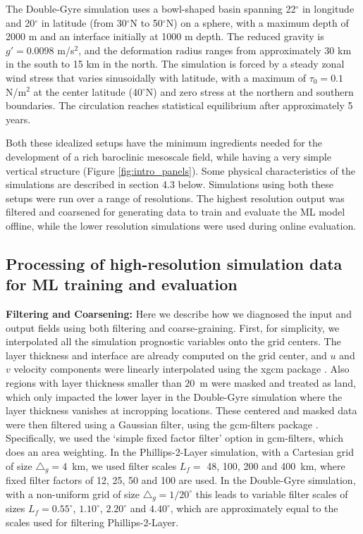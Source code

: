 \documentclass[draft]{agujournal2019}
\begin{document}
The Double-Gyre simulation uses a bowl-shaped basin spanning 22$^\circ$ in longitude and 20$^\circ$ in latitude (from 30$^\circ$N to 50$^\circ$N) on a sphere, with a maximum depth of 2000 m and an interface initially at 1000 m depth. The reduced gravity is $g' = 0.0098$ m/s$^2$, and the deformation radius ranges from approximately 30 km in the south to 15 km in the north. The simulation is forced 
by a steady zonal wind stress that varies sinusoidally with latitude, with a maximum of $\tau_0 = 0.1$ N/m$^2$ at the center latitude (40$^\circ$N) and zero stress at the northern and southern boundaries. The circulation reaches 
statistical equilibrium after approximately 5 years.

Both these idealized setups have the minimum ingredients needed for the development of a rich baroclinic mesoscale field, while having a very simple vertical structure (Figure \ref{fig:intro_panels}). Some physical characteristics of the simulations are described in section 4.3 below. Simulations using both these setups were run over a range of resolutions. The highest resolution output was filtered and coarsened for generating data to train and evaluate the ML model offline, while the lower resolution simulations were used during online evaluation.


\subsection{Processing of high-resolution simulation data for ML training and evaluation}
\label{sec:data/filter_coarsen}
\textbf{Filtering and Coarsening:}
Here we describe how we diagnosed the input and output fields using both filtering and coarse-graining. First, for simplicity, we interpolated all the simulation prognostic variables onto the grid centers. 
The layer thickness and interface are already computed on the grid center, and $u$ and $v$ velocity components were linearly interpolated using the xgcm package \cite{abernathey_2022_7348619}.
Also regions with layer thickness smaller than $20$~m were masked and treated as land, which only impacted the lower layer in the Double-Gyre simulation where the layer thickness vanishes at incropping locations. These centered and masked data were then filtered using a Gaussian filter, using the gcm-filters package \cite{loose2022gcm}.  Specifically, we used the `simple fixed factor filter' option in gcm-filters, which does an area weighting. In the Phillips-2-Layer simulation, with a Cartesian grid of size $\triangle_g = 4$~km, we used filter scales $L_f=$ 48, 100, 200 and 400~km, where fixed filter factors of 12, 25, 50 and 100 are used. In the Double-Gyre simulation, with a non-uniform grid of size $\triangle_g =1/20^\circ$ this leads to variable filter scales of sizes $L_f =0.55^\circ$, $1.10^\circ$, $2.20^\circ$ and $4.40^\circ$, which are approximately equal to the scales used for filtering Phillips-2-Layer. 
\end{document}
